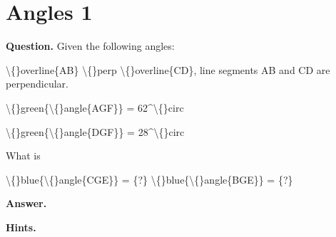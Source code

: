 \documentclass{article}
\begin{document}
\section*{Angles 1}
\textbf{Question.} Given the following angles:
                        
                            
                                \textbackslash\{\}overline\{AB\} \textbackslash\{\}perp \textbackslash\{\}overline\{CD\},
                                line segments AB and CD are perpendicular.
                            
                            
                                
                                
                                    \textbackslash\{\}green\{\textbackslash\{\}angle\{AGF\}\} = 62\textasciicircum{}\textbackslash\{\}circ
                                
                                
                                    \textbackslash\{\}green\{\textbackslash\{\}angle\{DGF\}\} = 28\textasciicircum{}\textbackslash\{\}circ
                                
                            
                        
                        
                            What is
                            
                            \textbackslash\{\}blue\{\textbackslash\{\}angle\{CGE\}\} = \{?\}
                            \textbackslash\{\}blue\{\textbackslash\{\}angle\{BGE\}\} = \{?\}

\textbf{Answer.} 

\textbf{Hints.}
\begin{itemize}

\end{itemize}
\end{document}
